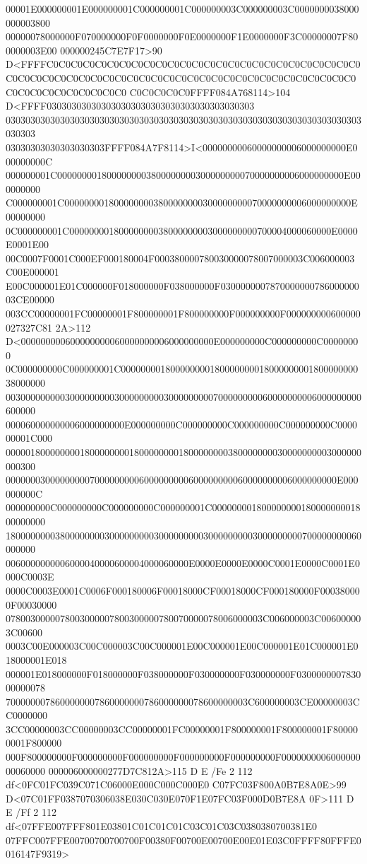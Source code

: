 00001E000000001E000000001C000000001C000000003C000000003C0000000038000000003800
00000078000000F070000000F0F0000000F0E0000000F1E0000000F3C00000007F800000003E00
000000245C7E7F17>90 D<FFFFC0C0C0C0C0C0C0C0C0C0C0C0C0C0C0C0C0C0C0C0C0C0C0C0C0C0
C0C0C0C0C0C0C0C0C0C0C0C0C0C0C0C0C0C0C0C0C0C0C0C0C0C0C0C0C0C0C0C0C0C0C0C0C0C0C0
C0C0C0C0C0FFFF084A768114>104 D<FFFF030303030303030303030303030303030303030303
030303030303030303030303030303030303030303030303030303030303030303030303030303
03030303030303030303FFFF084A7F8114>I<00000000060000000006000000000E000000000C
000000001C0000000018000000003800000000300000000070000000006000000000E000000000
C000000001C0000000018000000003800000000300000000070000000006000000000E00000000
0C000000001C00000000180000000038000000003000000000700004000060000E0000E0001E00
00C0007F0001C000EF000180004F000380000780030000078007000003C006000003C00E000001
E00C000001E01C000000F018000000F038000000F030000000787000000078600000003CE00000
003CC00000001FC00000001F800000001F800000000F000000000F000000000600000027327C81
2A>112 D<000000000600000000060000000006000000000E000000000C000000000C00000000
0C000000000C000000001C00000000180000000018000000001800000000180000000038000000
003000000000300000000030000000003000000000700000000060000000006000000000600000
000060000000006000000000E000000000C000000000C000000000C000000000C000000001C000
000001800000000180000000018000000001800000000380000000030000000003000000000300
0000000300000000070000000006000000000600000000060000000006000000000E000000000C
000000000C000000000C000000000C000000001C00000000180000000018000000001800000000
180000000038000000003000000000300000000030000000003000000000700000000060000000
0060000000006000040000600004000060000E0000E0000E0000C0001E0000C0001E0000C0003E
0000C0003E0001C0006F000180006F00018000CF00018000CF000180000F000380000F00030000
0780030000078003000007800300000780070000078006000003C006000003C006000003C00600
0003C00E000003C00C000003C00C000001E00C000001E00C000001E01C000001E018000001E018
000001E018000000F018000000F038000000F030000000F030000000F030000000783000000078
7000000078600000007860000000786000000078600000003C600000003CE00000003CC0000000
3CC00000003CC00000003CC00000001FC00000001F800000001F800000001F800000001F800000
000F800000000F000000000F000000000F000000000F000000000F000000000600000000060000
000006000000277D7C812A>115 D E /Fe 2 112 df<0FC01FC039C071C06000E000C000C000E0
C07FC03F800A0B7E8A0E>99 D<07C01FF0387070306038E030C030E070F1E07FC03F000D0B7E8A
0F>111 D E /Ff 2 112 df<07FFE007FFF801E03801C01C01C01C03C01C03C0380380700381E0
07FFC007FFE00700700700700F00380F00700E00700E00E01E03C0FFFF80FFFE0016147F9319>
